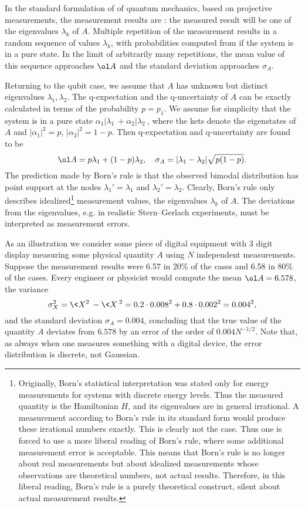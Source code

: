 \documentclass[12pt]{article}
\begin{document}
In the standard formulation of 
of quantum mechanics, based on projective measurements, the measurement
results are : the measured result will be one of the
eigenvalues $\lambda_k$ of $A$.
Multiple repetition of the measurement results in a random sequence of
values $\lambda_k$, with probabilities computed from 
if the system is in a pure state. In the limit of arbitrarily many
repetitions, the mean value of this sequence approaches $\ol A$ and the
standard deviation approaches $\sigma_A$.

Returning to the qubit case, we assume that $A$ has unknown but distinct
eigenvalues $\lambda_1,\lambda_2$. The q-expectation and the
q-uncertainty of $A$ can be exactly calculated in terms of the
probability $p=p_1$. We assume for simplicity that the system is in a
pure state $\alpha_1|\lambda_1\>+\alpha_2|\lambda_2\>$, where the kets
denote the eigenstates of $A$ and $|\alpha_1|^2=p$, $|\alpha_2|^2=1-p$.
Then q-expectation and q-uncertainty are found to be 
\[
\ol A=p\lambda_1+(1-p)\lambda_2,~~~
\sigma_A=|\lambda_1-\lambda_2|\sqrt{p(1-p)}.
\]
The prediction made by Born's rule is that the observed bimodal 
distribution has point support at the nodes $\lambda_{1}'=\lambda_{1}$
and $\lambda_{2}'=\lambda_{2}$. Clearly, Born's rule only describes
idealized\footnote{\label{f.irrat}
Originally, Born's statistical interpretation was stated
only for energy measurements for systems with discrete energy
levels. Thus the measured quantity is the Hamiltonian $H$,
and its eigenvalues are in general irrational. A measurement according
to Born's rule in its standard form would produce these irrational
numbers exactly. This is clearly not the case. Thus one is forced to 
use a more liberal reading of Born's rule, where some additional
measurement error is acceptable. This means that Born's rule is no 
longer about real measurements but about idealized measurements whose 
observations are theoretical numbers, not actual results. Therefore, in 
this liberal reading, Born's rule is a purely theoretical construct, 
silent about actual measurement results.
} %
measurement values, the eigenvalues $\lambda_k$ of $A$.
The deviations from the eigenvalues, e.g. in realistic Stern--Gerlach
experiments, must be interpreted as measurement errors.

As an illustration we
consider some piece of digital equipment with 3 digit display measuring
some physical quantity $A$ using $N$ independent measurements. Suppose
the measurement results were 6.57 in 20\% of the cases and 6.58 in 80\%
of the cases. Every engineer or physicist would compute the mean
$\ol A= 6.578$, the variance 
\[
\sigma_X^2=\<X^2\>-\<X\>^2=0.2\cdot 0.008^2+0.8\cdot 0.002^2=0.004^2, 
\]
and the standard deviation
$\sigma_A=0.004$, concluding that the true value of the quantity $A$
deviates from $6.578$ by an error of the order of $0.004N^{-1/2}$.
Note that, as always when one measures something with a digital device,
the error distribution is discrete, not Gaussian.
\end{document}

